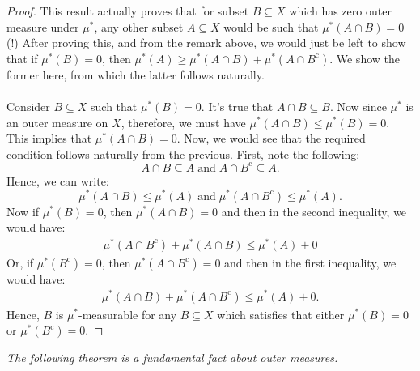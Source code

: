 \documentclass{article}
\theoremstyle{definition}
\theoremstyle{remark}
\theoremstyle{definition}
\theoremstyle{definition}
\theoremstyle{definition}
\newcommand{\intrs}{\cap}
\newcommand{\comp}[1]{#1^{\text{c}}}
\newcommand{\om}[1]{\mu^*\left ( #1\right )}
\begin{document}
\begin{proof}
	This result actually proves that for subset $ B \subseteq X$ which has zero outer measure under $ \mu^* $, any other subset $ A\subseteq X $ would be such that $ \om{A\intrs B} = 0 $(!) After proving this, and from the remark above, we would just be left to show that if $ \om{B} = 0 $, then $ \om{A} \ge \om{A\intrs B} + \om{A\intrs \comp{B}}$. We show the former here, from which the latter follows naturally.\\\\
	Consider $ B\subseteq X $ such that $ \om{B} = 0 $. It's true that $ A\intrs B \subseteq B $. Now since $ \mu^* $ is an outer measure on $ X $, therefore, we must have $ \om{A\intrs B} \le \om{B} = 0.$ This implies that $ \om{A\intrs B} = 0 $. Now, we would see that the required condition follows naturally from the previous. First, note the following:
	\[A\intrs B \subseteq A\;\text{and}\; A\intrs \comp{B} \subseteq A.\]
	Hence, we can write:
	\[\om{A\intrs B} \le \om{A}\;\text{and}\;\om{A\intrs \comp{B}}\le \om{A}.\]
	 Now if $ \om{B} = 0 $, then $ \om{A\intrs B} = 0 $ and then in the second inequality, we would have:
	 \begin{equation*}
	 	\begin{split}
	 		\om{A\intrs \comp{B}} + \om{A\intrs B} \le \om{A} + 0
	 	\end{split}
	 \end{equation*}
 	Or, if $ \om{\comp{B}}  = 0$, then $ \om{A\intrs \comp{B}}= 0 $ and then in the first inequality, we would have:
 	\begin{equation*}
 		\begin{split}
 			\om{A\intrs B} + \om{A\intrs \comp{B}} \le \om{A} + 0.
 		\end{split}
 	\end{equation*}
 Hence, $ B $ is $ \mu^* $-measurable for any $ B\subseteq X $ which satisfies that either $ \om{B} = 0 $ or $ \om{\comp{B}} = 0 $.
\end{proof}
\hrulefill

\emph{The following theorem is a fundamental fact about outer measures.}
\newpage
\end{document}
